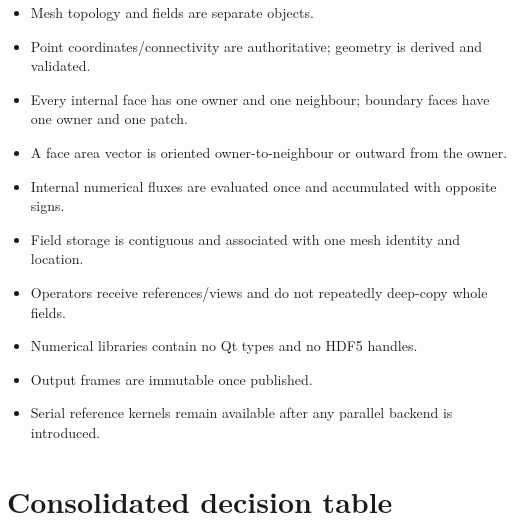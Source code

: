 \documentclass[11pt,a4paper]{article}
\begin{document}
\begin{itemize}
  \item Mesh topology and fields are separate objects.
  \item Point coordinates/connectivity are authoritative; geometry is derived and validated.
  \item Every internal face has one owner and one neighbour; boundary faces have one owner and one patch.
  \item A face area vector is oriented owner-to-neighbour or outward from the owner.
  \item Internal numerical fluxes are evaluated once and accumulated with opposite signs.
  \item Field storage is contiguous and associated with one mesh identity and location.
  \item Operators receive references/views and do not repeatedly deep-copy whole fields.
  \item Numerical libraries contain no Qt types and no HDF5 handles.
  \item Output frames are immutable once published.
  \item Serial reference kernels remain available after any parallel backend is introduced.
\end{itemize}

\section{Consolidated decision table}
\end{document}
